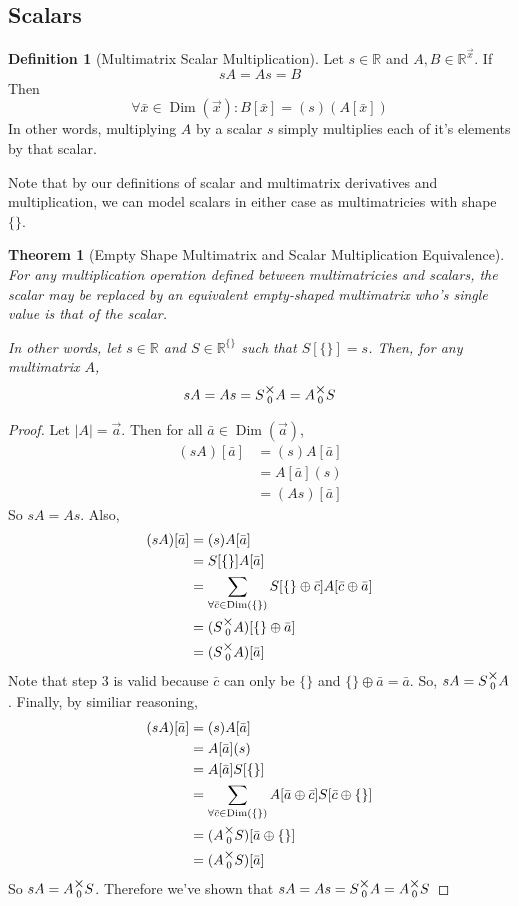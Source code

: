 \documentclass[12pt]{article}
\theoremstyle{definition}
\newtheorem{definition}{Definition}[section]
\theoremstyle{plain}
\newtheorem{theorem}{Theorem}[section]
\theoremstyle{ppart}
\DeclareMathOperator{\Dim}{Dim}
\newcommand{\mmult}[1]{\text{\raisebox{1ex}{$\underset{#1}{\times}$}}}
\begin{document}
\subsection{Scalars}

\begin{definition}[Multimatrix Scalar Multiplication]
Let $s \in \mathbb{R}$ and $A, B \in \mathbb{R}^{\vec{x}}$. If
\[ sA = As = B \]
Then
\[ \forall \bar{x} \in \Dim(\vec{x}):
   B[\bar{x}] = (s)(A[\bar{x}]) \]
In other words, multiplying $A$ by a scalar $s$ simply multiplies each of
it's elements by that scalar.
\end{definition}

Note that by our definitions of scalar and multimatrix derivatives and multiplication,
we can model scalars in either case as multimatricies with shape $\{\}$.

\begin{theorem}[Empty Shape Multimatrix and Scalar Multiplication Equivalence]
\label{s_mm_mult_equiv}
For any multiplication operation defined between multimatricies and scalars,
the scalar may be replaced by an equivalent empty-shaped multimatrix who's
single value is that of the scalar.

In other words, let $s \in \mathbb{R}$ and $S \in \mathbb{R}^{\{\}}$ such that
$S[\{\}] = s$. Then, for any multimatrix $A$, 
\[ sA = As = S \mmult{0} A = A \mmult{0} S \]
\end{theorem}
\begin{proof}
Let $|A| = \vec{a}$. Then for all $\bar{a} \in \Dim(\vec{a})$,
\begin{align*}
	(sA)[\bar{a}]
	&= (s)A[\bar{a}] \\
	&= A[\bar{a}](s) \\
	&= (As)[\bar{a}]
\end{align*}
So $sA = As$. Also,
\begin{align}
	(sA)[\bar{a}]
	&= (s)A[\bar{a}] \\
	&= S[\{\}]A[\bar{a}] \\
	&= \sum_{\forall \bar{c} \in \Dim(\{\})}
		S[\{\} \oplus \bar{c}]A[\bar{c} \oplus \bar{a}] \\
	&= (S \mmult{0} A)[\{\} \oplus \bar{a}] \\
	&= (S \mmult{0} A)[\bar{a}] \\
\end{align}
Note that step 3 is valid because $\bar{c}$ can only be $\{\}$ and
$\{\} \oplus \bar{a} = \bar{a}$. So, $sA = S \mmult{0} A$.
Finally, by similiar reasoning,
\begin{align*}
	(sA)[\bar{a}]
	&= (s)A[\bar{a}] \\
	&= A[\bar{a}](s) \\
	&= A[\bar{a}]S[\{\}] \\
	&= \sum_{\forall \bar{c} \in \Dim(\{\})}
		A[\bar{a} \oplus \bar{c}] S[\bar{c} \oplus \{\}] \\
	&= (A \mmult{0} S)[\bar{a} \oplus \{\}] \\
	&= (A \mmult{0} S)[\bar{a}]
\end{align*}
So $sA = A \mmult{0} S$. Therefore we've shown that
$sA = As = S \mmult{0} A = A \mmult{0} S$
\end{proof}
\end{document}

